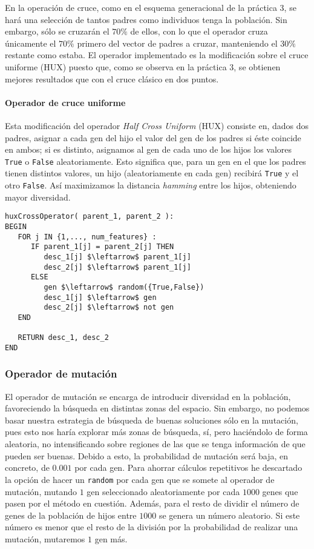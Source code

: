 \documentclass[11pt,leqno]{article}
\begin{document}
	En la operación de cruce, como en el esquema generacional de la práctica 3, se hará una selección de tantos padres como individuos tenga la población. Sin embargo, sólo se cruzarán el $70\%$ de ellos, con lo que el operador cruza únicamente el $70\%$ primero del vector de padres a cruzar, manteniendo el $30\%$ restante como estaba. El operador implementado es la modificación sobre el cruce uniforme (HUX) puesto que, como se observa en la práctica 3, se obtienen mejores resultados que con el cruce clásico en dos puntos.
	
\paragraph{Operador de cruce uniforme}	Esta modificación del operador \textit{Half Cross Uniform} (HUX) consiste en, dados dos padres, asignar a cada gen del hijo el valor del gen de los padres si éste coincide en ambos; si es distinto, asignamos al gen de cada uno de los hijos los valores \texttt{True} o \texttt{False} aleatoriamente. Esto significa que, para un gen en el que los padres tienen distintos valores, un hijo (aleatoriamente en cada gen) recibirá \texttt{True} y el otro \texttt{False}. Así maximizamos la distancia \textit{hamming} entre los hijos, obteniendo mayor diversidad. 
	
\begin{lstlisting}[mathescape=true]
huxCrossOperator( parent_1, parent_2 ):
BEGIN
   FOR j IN {1,..., num_features} :
      IF parent_1[j] = parent_2[j] THEN
         desc_1[j] $\leftarrow$ parent_1[j]
         desc_2[j] $\leftarrow$ parent_1[j]
      ELSE
         gen $\leftarrow$ random({True,False})
         desc_1[j] $\leftarrow$ gen     
         desc_2[j] $\leftarrow$ not gen
   END
   
   RETURN desc_1, desc_2
END
\end{lstlisting}
	
	
\subsubsection{Operador de mutación}

	El operador de mutación se encarga de introducir diversidad en la población, favoreciendo la búsqueda en distintas zonas del espacio. Sin embargo, no podemos basar nuestra estrategia de búsqueda de buenas soluciones sólo en la mutación, pues esto nos haría explorar más zonas de búsqueda, sí, pero haciéndolo de forma aleatoria, no intensificando sobre regiones de las que se tenga información de que pueden ser buenas. Debido a esto, la probabilidad de mutación será baja, en concreto, de $0.001$ por cada gen. Para ahorrar cálculos repetitivos he descartado la opción de hacer un \texttt{random} por cada gen que se somete al operador de mutación, mutando $1$ gen seleccionado aleatoriamente por cada $1000$ genes que pasen por el método en cuestión. Además, para el resto de dividir el número de genes de la población de hijos entre $1000$ se genera un número aleatorio. Si este número es menor que el resto de la división por la probabilidad de realizar una mutación, mutaremos $1$ gen más.
\end{document}
